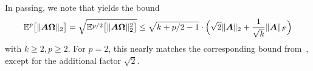 In passing, we note that   yields the bound
    \begin{equation}
        \mathbb{E}^{p}\big[ \lVert \boldsymbol{A} \boldsymbol{\Omega} \rVert _2 \big] = \sqrt{\mathbb{E}^{p/2}\big[ \lVert \boldsymbol{A} \boldsymbol{\Omega} \rVert _2^2 \big]} \leq \sqrt{k + p/2-1} \cdot \Big(\sqrt{2} \lVert \boldsymbol{A} \rVert _2 + \frac{1}{\sqrt{k}}\lVert \boldsymbol{A} \rVert_F\Big)
    \end{equation}
    with $k\ge 2, p\ge 2$. For $p = 2$, this nearly matches the corresponding bound from~\cite[Lemma B.1]{tropp-2023-randomized-algorithms}, except for the additional factor $\sqrt{2}$.
